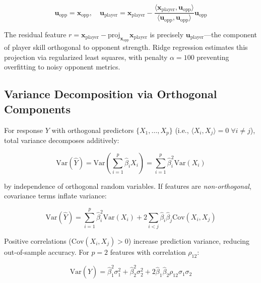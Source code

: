 \begin{equation}
\mathbf{u}_{\text{opp}} = \mathbf{x}_{\text{opp}}, \quad \mathbf{u}_{\text{player}} = \mathbf{x}_{\text{player}} - \frac{\langle \mathbf{x}_{\text{player}}, \mathbf{u}_{\text{opp}} \rangle}{\langle \mathbf{u}_{\text{opp}}, \mathbf{u}_{\text{opp}} \rangle} \mathbf{u}_{\text{opp}}
\end{equation}

The residual feature $r = \mathbf{x}_{\text{player}} - \text{proj}_{\mathbf{x}_{\text{opp}}} \mathbf{x}_{\text{player}}$ is precisely $\mathbf{u}_{\text{player}}$---the component of player skill orthogonal to opponent strength. Ridge regression estimates this projection via regularized least squares, with penalty $\alpha = 100$ preventing overfitting to noisy opponent metrics.

\subsection{Variance Decomposition via Orthogonal Components}

For response $Y$ with orthogonal predictors $\{X_1, \ldots, X_p\}$ (i.e., $\langle X_i, X_j \rangle = 0 \; \forall i \neq j$), total variance decomposes additively:

\begin{equation}
\text{Var}(\hat{Y}) = \text{Var}\left( \sum_{i=1}^{p} \hat{\beta}_i X_i \right) = \sum_{i=1}^{p} \hat{\beta}_i^2 \text{Var}(X_i)
\label{eq:variance-decomp-orthogonal}
\end{equation}

by independence of orthogonal random variables. If features are \emph{non-orthogonal}, covariance terms inflate variance:

\begin{equation}
\text{Var}(\hat{Y}) = \sum_{i=1}^{p} \hat{\beta}_i^2 \text{Var}(X_i) + 2 \sum_{i<j} \hat{\beta}_i \hat{\beta}_j \text{Cov}(X_i, X_j)
\label{eq:variance-decomp-correlated}
\end{equation}

Positive correlations ($\text{Cov}(X_i, X_j) > 0$) increase prediction variance, reducing out-of-sample accuracy. For $p=2$ features with correlation $\rho_{12}$:

\begin{equation}
\text{Var}(\hat{Y}) = \hat{\beta}_1^2 \sigma_1^2 + \hat{\beta}_2^2 \sigma_2^2 + 2 \hat{\beta}_1 \hat{\beta}_2 \rho_{12} \sigma_1 \sigma_2
\end{equation}

